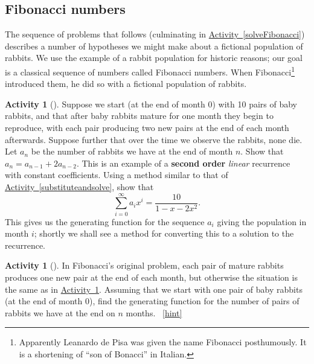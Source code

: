 \documentclass[10pt,]{book}
\newcommand{\terminology}[1]{\textbf{#1}}
\theoremstyle{plain}
\theoremstyle{definition}
\theoremstyle{definition}
\theoremstyle{definition}
\newtheorem{activity}[project]{Activity}
\numberwithin{equation}{chapter}
\begin{document}
\subsection[{Fibonacci numbers}]{Fibonacci numbers}\label{subsection-37}
\hypertarget{p-1347}{}%
The sequence of problems that follows (culminating in \hyperref[solveFibonacci]{Activity~\ref{solveFibonacci}}) describes a number of hypotheses we might make about a fictional population of rabbits. We use the example of a rabbit population for historic reasons; our goal is a classical sequence of numbers called Fibonacci numbers. When Fibonacci\footnote{Apparently Leanardo de Pisa was given the name Fibonacci posthumously. It is a shortening of ``son of Bonacci'' in Italian.\label{fn-17}} introduced them, he did so with a fictional population of rabbits.%
\begin{activity}[]\label{secondorderintroduction}
\hypertarget{p-1348}{}%
Suppose we start (at the end of month 0) with 10 pairs of baby rabbits, and that after baby rabbits mature for one month they begin to reproduce, with each pair producing two new pairs at the end of each month afterwards. Suppose further that over the time we observe the rabbits, none die. Let \(a_n\) be the number of rabbits we have at the end of month \(n\). Show that \(a_n=a_{n-1} + 2a_{n-2}\). This is an example of a \terminology{second order} \emph{linear} recurrence with constant coefficients. Using a method similar to that of \hyperref[substituteandsolve]{Activity~\ref{substituteandsolve}}, show that%
\begin{equation*}
\sum_{i=0}^\infty a_ix^i = \frac{10}{1-x-2x^2}.
\end{equation*}
This gives us the generating function for the sequence \(a_i\) giving the population in month \(i\); shortly we shall see a method for converting this to a solution to the recurrence.%
\end{activity}
\begin{activity}[]\label{originalFibonacci}
\hypertarget{p-1350}{}%
In Fibonacci's original problem, each pair of mature rabbits produces one new pair at the end of each month, but otherwise the situation is the same as in \hyperref[secondorderintroduction]{Activity~\ref{secondorderintroduction}}.  Assuming that we start with one pair of baby rabbits (at the end of month 0), find the generating function for the number of pairs of rabbits we have at the end on \(n\) months.%
~\hfill{\tiny\hyperlink{a-261}{[hint]}\hypertarget{q-261}{}}\end{activity}
\end{document}
